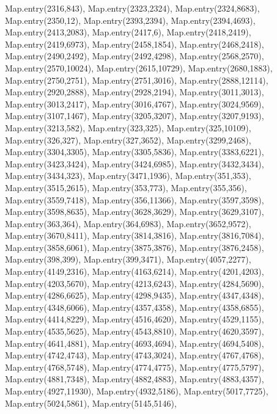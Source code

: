     Map.entry(2316,843),
    Map.entry(2323,2324),
    Map.entry(2324,8683),
    Map.entry(2350,12),
    Map.entry(2393,2394),
    Map.entry(2394,4693),
    Map.entry(2413,2083),
    Map.entry(2417,6),
    Map.entry(2418,2419),
    Map.entry(2419,6973),
    Map.entry(2458,1854),
    Map.entry(2468,2418),
    Map.entry(2490,2492),
    Map.entry(2492,4298),
    Map.entry(2568,2570),
    Map.entry(2570,10024),
    Map.entry(2615,10729),
    Map.entry(2680,1883),
    Map.entry(2750,2751),
    Map.entry(2751,3016),
    Map.entry(2888,12114),
    Map.entry(2920,2888),
    Map.entry(2928,2194),
    Map.entry(3011,3013),
    Map.entry(3013,2417),
    Map.entry(3016,4767),
    Map.entry(3024,9569),
    Map.entry(3107,1467),
    Map.entry(3205,3207),
    Map.entry(3207,9193),
    Map.entry(3213,582),
    Map.entry(323,325),
    Map.entry(325,10109),
    Map.entry(326,327),
    Map.entry(327,3652),
    Map.entry(3299,2468),
    Map.entry(3304,3305),
    Map.entry(3305,5836),
    Map.entry(3383,6221),
    Map.entry(3423,3424),
    Map.entry(3424,6985),
    Map.entry(3432,3434),
    Map.entry(3434,323),
    Map.entry(3471,1936),
    Map.entry(351,353),
    Map.entry(3515,2615),
    Map.entry(353,773),
    Map.entry(355,356),
    Map.entry(3559,7418),
    Map.entry(356,11366),
    Map.entry(3597,3598),
    Map.entry(3598,8635),
    Map.entry(3628,3629),
    Map.entry(3629,3107),
    Map.entry(363,364),
    Map.entry(364,6983),
    Map.entry(3652,9572),
    Map.entry(3670,8411),
    Map.entry(3814,3816),
    Map.entry(3816,7084),
    Map.entry(3858,6061),
    Map.entry(3875,3876),
    Map.entry(3876,2458),
    Map.entry(398,399),
    Map.entry(399,3471),
    Map.entry(4057,2277),
    Map.entry(4149,2316),
    Map.entry(4163,6214),
    Map.entry(4201,4203),
    Map.entry(4203,5670),
    Map.entry(4213,6243),
    Map.entry(4284,5690),
    Map.entry(4286,6625),
    Map.entry(4298,9435),
    Map.entry(4347,4348),
    Map.entry(4348,6066),
    Map.entry(4357,4358),
    Map.entry(4358,6855),
    Map.entry(4414,8229),
    Map.entry(4516,4620),
    Map.entry(4529,1155),
    Map.entry(4535,5625),
    Map.entry(4543,8810),
    Map.entry(4620,3597),
    Map.entry(4641,4881),
    Map.entry(4693,4694),
    Map.entry(4694,5408),
    Map.entry(4742,4743),
    Map.entry(4743,3024),
    Map.entry(4767,4768),
    Map.entry(4768,5748),
    Map.entry(4774,4775),
    Map.entry(4775,5797),
    Map.entry(4881,7348),
    Map.entry(4882,4883),
    Map.entry(4883,4357),
    Map.entry(4927,11930),
    Map.entry(4932,5186),
    Map.entry(5017,7725),
    Map.entry(5024,5861),
    Map.entry(5145,5146),
